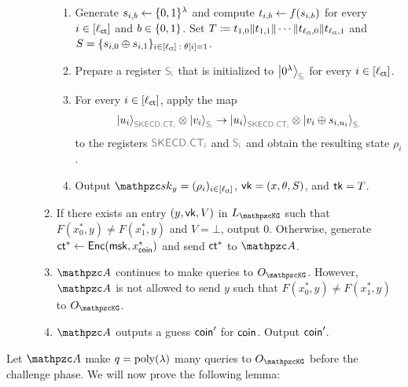 \begin{description}
\begin{enumerate}
\begin{enumerate}
    \item Generate $s_{i,b}\leftarrow\{0,1\}^\lambda$ and compute $t_{i,b}\leftarrow f(s_{i,b})$ for every $i\in[\ell_{\mathsf{ct}}]$ and $b\in\{0,1\}$. 
    Set $T\coloneqq
    t_{1,0}\|t_{1,1}\|\cdots\|t_{\ell_{\mathsf{ct}},0}\|t_{\ell_{\mathsf{ct}},1}$ and $S =
    \{s_{i,0} \oplus s_{i, 1}\}_{i \in [\ell_{\mathsf{ct}}] \; : \;\theta[i] =
    1}$.
    \item Prepare a register $\qreg{S_i}$ that is initialized to
    $\ket{0^\secp}_{\qreg{S_i}}$ for every $i\in[\ell_{\mathsf{ct}}]$. 
    \item For every $i\in[\ell_{\mathsf{ct}}]$, apply the map
    \begin{align}
    \ket{u_i}_{\qreg{SKECD.CT_i}}\tensor\ket{v_i}_{\qreg{S_i}}
    \ra
    \ket{u_i}_{\qreg{SKECD.CT_i}}\tensor\ket{v_i\oplus s_{i,u_i}}_{\qreg{S_i}}
    \end{align}
    to the registers $\qreg{SKECD.CT_i}$ and $\qreg{S_i}$ and obtain the resulting state $\rho_i$.
    \item Output $\qsk_y = (\rho_i)_{i\in{[\ctlen]}}$,
    $\mathsf{vk}=(x,\theta,S)$, and $\mathsf{tk}=T$.
\end{enumerate}

\item If there exists
an entry $(y,\mathsf{vk},V)$ in $\List{\qKG}$ such that $F(x_0^*,y)\ne
F(x_1^*,y)$ and $V=\bot$, output $0$. Otherwise, generate
$\mathsf{ct}^*\leftarrow\mathsf{Enc}(\mathsf{msk},x_{\mathsf{coin}}^*)$ and send $\mathsf{ct}^*$ to $\qA$.

\item $\qA$ continues to make queries to $\Oracle{\qKG}$. However, $\qA$ is not allowed to send $y$ such that $F(x_0^*,y)\ne F(x_1^*,y)$ to $\Oracle{\qKG}$.

\item $\qA$ outputs a guess $\mathsf{coin}^\prime$ for $\mathsf{coin}$. Output
$\mathsf{coin}'$.
\end{enumerate}
\end{description}

Let $\qA$ make $q = {\mathrm{poly}}(\lambda)$ many queries to $\Oracle{\qKG}$
before the challenge phase. We will now prove the following lemma:

